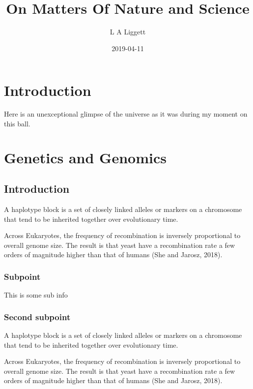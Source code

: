 \documentclass[]{book}
\title{On Matters Of Nature and Science}
\author{L A Liggett}
\date{2019-04-11}
\begin{document}
\maketitle

{
\setcounter{tocdepth}{1}
\tableofcontents
}
\hypertarget{introduction}{%
\chapter{Introduction}\label{introduction}}

Here is an unexceptional glimpse of the universe as it was during my moment on this ball.

\hypertarget{g2}{%
\chapter{Genetics and Genomics}\label{g2}}

\hypertarget{introduction-1}{%
\section{Introduction}\label{introduction-1}}

A haplotype block is a set of closely linked alleles or markers on a chromosome that tend to be inherited together over evolutionary time.

Across Eukaryotes, the frequency of recombination is inversely proportional to overall genome size. The result is that yeast have a recombination rate a few orders of magnitude higher than that of humans (She and Jarosz, 2018).

\hypertarget{subpoint}{%
\subsection{Subpoint}\label{subpoint}}

This is some sub info

\hypertarget{second-subpoint}{%
\subsection{Second subpoint}\label{second-subpoint}}

A haplotype block is a set of closely linked alleles or markers on a chromosome that tend to be inherited together over evolutionary time.

Across Eukaryotes, the frequency of recombination is inversely proportional to overall genome size. The result is that yeast have a recombination rate a few orders of magnitude higher than that of humans (She and Jarosz, 2018).
\end{document}
